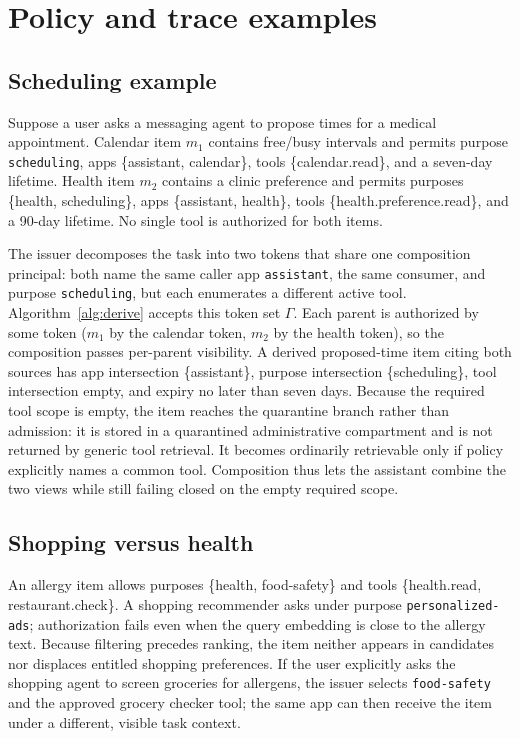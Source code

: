 \section{Policy and trace examples}
\label{app:policy}

\subsection{Scheduling example}

Suppose a user asks a messaging agent to propose times for a medical appointment. Calendar item $m_1$ contains free/busy intervals and permits purpose \texttt{scheduling}, apps \{assistant, calendar\}, tools \{calendar.read\}, and a seven-day lifetime. Health item $m_2$ contains a clinic preference and permits purposes \{health, scheduling\}, apps \{assistant, health\}, tools \{health.preference.read\}, and a 90-day lifetime. No single tool is authorized for both items.

The issuer decomposes the task into two tokens that share one composition principal: both name the same caller app \texttt{assistant}, the same consumer, and purpose \texttt{scheduling}, but each enumerates a different active tool. Algorithm~\ref{alg:derive} accepts this token set $\Gamma$. Each parent is authorized by some token ($m_1$ by the calendar token, $m_2$ by the health token), so the composition passes per-parent visibility. A derived proposed-time item citing both sources has app intersection \{assistant\}, purpose intersection \{scheduling\}, tool intersection empty, and expiry no later than seven days. Because the required tool scope is empty, the item reaches the quarantine branch rather than admission: it is stored in a quarantined administrative compartment and is not returned by generic tool retrieval. It becomes ordinarily retrievable only if policy explicitly names a common tool. Composition thus lets the assistant combine the two views while still failing closed on the empty required scope.

\subsection{Shopping versus health}

An allergy item allows purposes \{health, food-safety\} and tools \{health.read, restaurant.check\}. A shopping recommender asks under purpose \texttt{personalized-ads}; authorization fails even when the query embedding is close to the allergy text. Because filtering precedes ranking, the item neither appears in candidates nor displaces entitled shopping preferences. If the user explicitly asks the shopping agent to screen groceries for allergens, the issuer selects \texttt{food-safety} and the approved grocery checker tool; the same app can then receive the item under a different, visible task context.

